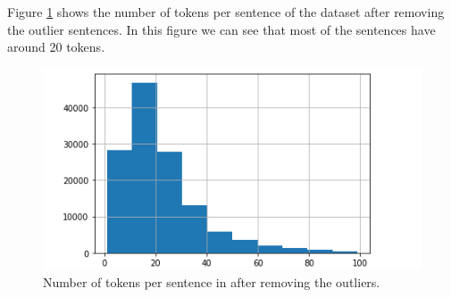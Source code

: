 Figure \ref{amazon_en_tokens_per_sentence} shows the number of tokens per sentence of the dataset after removing the outlier sentences. In this figure we can see that most of the sentences have around 20 tokens.
\begin{figure}[h]
\centerline{\includegraphics[scale=.5]{images/tokens_per_sentence_amazon_eng_after.png}}
\caption{Number of tokens per sentence in \dataEN after removing the outliers.}
\label{amazon_en_tokens_per_sentence}
\end{figure}
